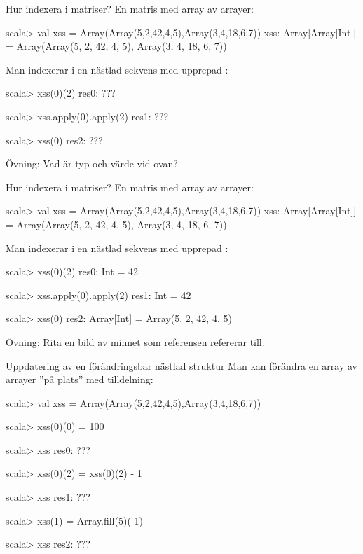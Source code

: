 \begin{Slide}{Hur indexera i matriser?}
En matris med array av arrayer:
\begin{REPL}
scala> val xss = Array(Array(5,2,42,4,5),Array(3,4,18,6,7))
xss: Array[Array[Int]] = Array(Array(5, 2, 42, 4, 5), Array(3, 4, 18, 6, 7))
\end{REPL}
\pause
Man indexerar i en nästlad sekvens med upprepad :
\begin{REPL}
scala> xss(0)(2)
res0: ???

scala> xss.apply(0).apply(2)
res1: ???

scala> xss(0)
res2: ???
\end{REPL}
Övning: Vad är typ och värde vid  ovan?
\end{Slide}

\begin{Slide}{Hur indexera i matriser?}
En matris med array av arrayer:
\begin{REPL}
scala> val xss = Array(Array(5,2,42,4,5),Array(3,4,18,6,7))
xss: Array[Array[Int]] = Array(Array(5, 2, 42, 4, 5), Array(3, 4, 18, 6, 7))
\end{REPL}

Man indexerar i en nästlad sekvens med upprepad :
\begin{REPL}
scala> xss(0)(2)
res0: Int = 42

scala> xss.apply(0).apply(2)
res1: Int = 42

scala> xss(0)
res2: Array[Int] = Array(5, 2, 42, 4, 5)
\end{REPL}
Övning: Rita en bild av minnet som referensen  refererar till.

\end{Slide}

\begin{Slide}{Uppdatering av en förändringsbar nästlad struktur}
Man kan förändra en array av arrayer ''på plats'' med tilldelning:
\begin{REPL}
scala> val xss = Array(Array(5,2,42,4,5),Array(3,4,18,6,7))

scala> xss(0)(0) = 100

scala> xss
res0: ???

scala> xss(0)(2) = xss(0)(2) - 1

scala> xss
res1: ???

scala> xss(1) = Array.fill(5)(-1)

scala> xss
res2: ???
\end{REPL}
\end{Slide}


